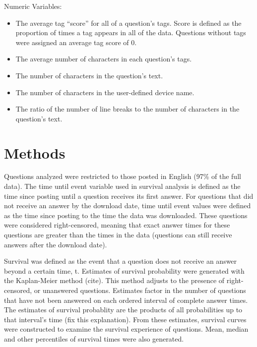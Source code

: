 \documentclass[12pt]{article}
\begin{document}
Numeric Variables:

\begin{itemize}
  \item The average tag ``score'' for all of a question's tags. Score is defined as the proportion of times a tag appears in all of the data. Questions without tags were assigned an average tag score of 0. 
  \item The average number of characters in each question's tags. 
  \item The number of characters in the question's text. 
  \item The number of characters in the user-defined device name. 
  \item The ratio of the number of line breaks to the number of characters in the question's text.
\end{itemize}


\section{Methods}

    Questions analyzed were restricted to those posted in English (97\% of the full data). The time until event variable used in survival analysis is defined as the time since posting until a question receives its first answer. For questions that did not receive an answer by the download date, time until event values were defined as the time since posting to the time the data was downloaded. These questions were considered right-censored, meaning that exact answer times for these questions are greater than the times in the data (questions can still receive answers after the download date). 

Survival was defined as the event that a question does not receive an answer beyond a certain time, t. Estimates of survival probability were generated with the Kaplan-Meier method (cite). This method adjusts to the presence of right-censored, or unanswered questions. Estimates factor in the number of questions that have not been answered on each ordered interval of complete answer times. The estimates of survival probablity are the products of all probabilities up to that interval's time (fix this explanation). From these estimates, survival curves were constructed to examine the survival experience of questions. Mean, median and other percentiles of survival times were also generated. 
\end{document}
